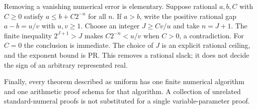 Removing a vanishing numerical error is elementary. Suppose
rational $a,b,C$ with $C\ge0$ satisfy $a\le b+C2^{-n}$ for all $n$.
If $a>b$, write the positive rational gap $a-b=u/v$ with $u,v\ge1$.
Choose an integer $J\ge Cv/u$ and take $n=J+1$. The finite inequality
$2^{J+1}>J$ makes $C2^{-n}<u/v$ when $C>0$, a contradiction.
For $C=0$ the conclusion is immediate. The choice of $J$ is an explicit
rational ceiling, and the exponent bound is PR. This removes a rational
slack; it does not decide the sign of an arbitrary represented real.

Finally, every theorem described as uniform has one finite numerical
algorithm and one arithmetic proof schema for that algorithm. A collection
of unrelated standard-numeral proofs is not substituted for a single
variable-parameter proof.
